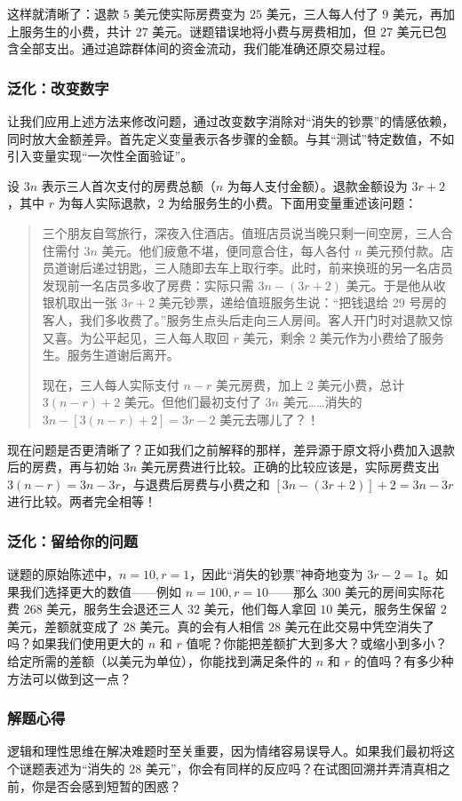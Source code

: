 这样就清晰了：退款 $5$ 美元使实际房费变为 $25$ 美元，三人每人付了 $9$ 美元，再加上服务生的小费，共计 $27$ 美元。谜题错误地将小费与房费相加，但 $27$ 美元已包含全部支出。通过追踪群体间的资金流动，我们能准确还原交易过程。

\subsubsection*{泛化：改变数字}

让我们应用上述方法来修改问题，通过改变数字消除对``消失的钞票''的情感依赖，同时放大金额差异。首先定义变量表示各步骤的金额。与其``测试''特定数值，不如引入变量实现``一次性全面验证''。

设 $3n$ 表示三人首次支付的房费总额（$n$ 为每人支付金额）。退款金额设为 $3r + 2$，其中 $r$ 为每人实际退款，$2$ 为给服务生的小费。下面用变量重述该问题：

\begin{quote}
    三个朋友自驾旅行，深夜入住酒店。值班店员说当晚只剩一间空房，三人合住需付 $3n$ 美元。他们疲惫不堪，便同意合住，每人各付 $n$ 美元预付款。店员道谢后递过钥匙，三人随即去车上取行李。此时，前来换班的另一名店员发现前一名店员多收了房费：实际只需 $3n - (3r + 2)$ 美元。于是他从收银机取出一张 $3r + 2$ 美元钞票，递给值班服务生说：``把钱退给 29 号房的客人，我们多收费了。''服务生点头后走向三人房间。客人开门时对退款又惊又喜。为公平起见，三人每人取回 $r$ 美元，剩余 $2$ 美元作为小费给了服务生。服务生道谢后离开。

    现在，三人每人实际支付 $n-r$ 美元房费，加上 $2$ 美元小费，总计 $3(n-r)+2$ 美元。但他们最初支付了 $3n$ 美元……消失的 $3n - [3(n - r) + 2]=3r - 2$ 美元去哪儿了？！
\end{quote}

现在问题是否更清晰了？正如我们之前解释的那样，差异源于原文将小费加入退款后的房费，再与初始 $3n$ 美元房费进行比较。正确的比较应该是，实际房费支出 $3(n-r) = 3n - 3r$，与退费后房费与小费之和 $[3n-(3r+2)] + 2 = 3n-3r$ 进行比较。两者完全相等！

\subsubsection*{泛化：留给你的问题}

谜题的原始陈述中，$n=10, r=1$，因此``消失的钞票''神奇地变为 $3r-2=1$。如果我们选择更大的数值——例如 $n=100, r=10$——那么 $300$ 美元的房间实际花费 $268$ 美元，服务生会退还三人 $32$ 美元，他们每人拿回 $10$ 美元，服务生保留 $2$ 美元，差额就变成了 $28$ 美元。真的会有人相信 $28$ 美元在此交易中凭空消失了吗？如果我们使用更大的 $n$ 和 $r$ 值呢？你能把差额扩大到多大？或缩小到多小？给定所需的差额（以美元为单位），你能找到满足条件的 $n$ 和 $r$ 的值吗？有多少种方法可以做到这一点？

\subsubsection*{解题心得}

逻辑和理性思维在解决难题时至关重要，因为情绪容易误导人。如果我们最初将这个谜题表述为``消失的 $28$ 美元''，你会有同样的反应吗？在试图回溯并弄清真相之前，你是否会感到短暂的困惑？
